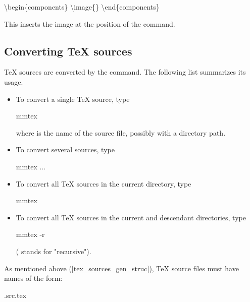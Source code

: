 \documentclass{generic}
\newcommand{\texcmd}[1]{\backslash#1}
\begin{document}
\begin{preformatted}%
\texcmd{begin}\{components\}
  \texcmd{image}\{\}
\texcmd{end}\{components\}
\end{preformatted}

This inserts the image at the position of the \code{\texcmd{image}} command.


\subsection{Converting TeX sources}

TeX sources are converted by the  command. The following list
summarizes its usage.

\begin{itemize}
\item
  To convert a single TeX source, type

  \begin{preformatted}mmtex \end{preformatted}

  where  is the name of the source file, possibly with
  a directory path.

\item
  To convert several sources, type

  \begin{preformatted}mmtex   ...\end{preformatted}

\item
  To convert all TeX sources in the current directory, type

  \begin{preformatted}mmtex\end{preformatted}

\item
  To convert all TeX sources in the current and descendant directories, type

  \begin{preformatted}mmtex -r\end{preformatted}

  ( stands for "recursive").
  
\end{itemize}

As mentioned above (\ref{tex_sources_gen_struc}), TeX source files must have names of the
form:

\begin{preformatted}%
  .src.tex
\end{preformatted}
\end{document}
